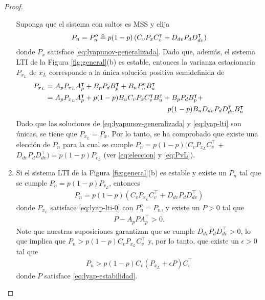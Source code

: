 \begin{proof}{\ \\}
\begin{enumerate}
Suponga que el sistema con saltos es MSS y elija
\begin{align}\label{eq:eleccion}
P_n = P_n^o \triangleq p(1-p) \left( C_v P_{x} C_v^{\intercal} + D_{dv} P_d D_{dv}^{\intercal} \right)
\end{align}
donde $P_x$ satisface \eqref{eq:lyapunov-generalizada}. Dado que, adem\'as, el sistema LTI de la Figura \ref{fig:general}(b) es estable, entonces la varianza estacionaria $P_{x_L}$ de $x_L$ corresponde a la \'unica soluci\'on positiva semidefinida de
\begin{align}
\label{eq:lyap-lti-0} P_{x_L} &= A_p P_{x_L} A_p^{\intercal} + B_p P_d B_p^{\intercal} + B_u P_n^o B_u^{\intercal} \\
\nonumber   &= A_p P_{x_L} A_p^{\intercal} + p(1-p)B_u C_v P_x C_v^{\intercal} B_u^{\intercal} + B_p P_d B_p^{\intercal} + \\ \label{eq:lyap-lti} & \hspace{60mm} p(1-p) B_u D_{dv} P_d D_{dv}^{\intercal} B_u^{\intercal}
\end{align}
Dado que las soluciones de \eqref{eq:lyapunov-generalizada} y \eqref{eq:lyap-lti} son \'unicas, se tiene que $P_{x_L}=P_x$. Por lo tanto, se ha comprobado que existe una elecci\'on de $P_n$ para la cual se cumple $P_n = p(1-p) \big( C_v P_{x_L} C_v^{\intercal}$ + $D_{dv} P_d
D_{dv}^{\intercal} \big) = p(1-p) P_{v_L}$ (ver \eqref{eq:eleccion} y \eqref{eq:PvL}).
\item Si el sistema LTI de la Figura \ref{fig:general}(b) es estable y existe un $P_n$ tal que se cumple $P_n=p(1-p)P_{v_L}$, entonces
\begin{align}
P_n = p(1-p) \left( C_v P_{x_L} C_v^{\intercal} + D_{dv} P_d
D_{dv}^{\intercal} \right)
\end{align}
donde $P_{x_L}$ satisface \eqref{eq:lyap-lti-0} con $P_n^o= P_n$, y existe un $P>0$ tal que
\begin{align}\label{eq:lyap-estabilidad}
P-A_pPA_p^{\intercal}>0.
\end{align}
Note que nuestras suposiciones garantizan que se cumple $D_{dv} P_d D_{dv}^{\intercal}>0$, lo que implica que $P_n > p(1-p) C_v P_{x_L}C_v^{\intercal}$ y, por lo tanto, que existe un $\epsilon>0$ tal que
\begin{align}\label{eq:Pq-epsilon}
P_n > p(1-p) C_v \left( P_{x_L} + \epsilon P \right) C_v^{\intercal}
\end{align}
donde $P$ satisface \eqref{eq:lyap-estabilidad}.  


\end{enumerate}
\end{proof}
